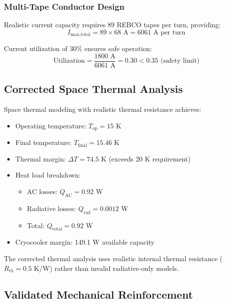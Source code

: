 \subsubsection{Multi-Tape Conductor Design}

Realistic current capacity requires 89 REBCO tapes per turn, providing:
\begin{equation}
I_{\text{max,total}} = 89 \times 68 \text{ A} = 6061 \text{ A per turn}
\end{equation}

Current utilization of 30\% ensures safe operation:
\begin{equation}
\text{Utilization} = \frac{1800 \text{ A}}{6061 \text{ A}} = 0.30 < 0.35 \text{ (safety limit)}
\end{equation}

\subsection{Corrected Space Thermal Analysis}

Space thermal modeling with realistic thermal resistance achieves:

\begin{itemize}
\item Operating temperature: $T_{\text{op}} = 15$ K
\item Final temperature: $T_{\text{final}} = 15.46$ K
\item Thermal margin: $\Delta T = 74.5$ K (exceeds 20 K requirement)
\item Heat load breakdown:
  \begin{itemize}
  \item AC losses: $Q_{\text{AC}} = 0.92$ W
  \item Radiative losses: $Q_{\text{rad}} = 0.0012$ W
  \item Total: $Q_{\text{total}} = 0.92$ W
  \end{itemize}
\item Cryocooler margin: 149.1 W available capacity
\end{itemize}

The corrected thermal analysis uses realistic internal thermal resistance ($R_{th} = 0.5$ K/W) rather than invalid radiative-only models.

\subsection{Validated Mechanical Reinforcement}

